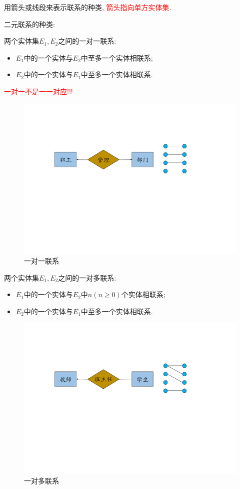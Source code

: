 用箭头或线段来表示联系的种类, \textcolor{red}{箭头指向单方实体集}.


二元联系的种类:
\begin{definition}[一对一联系]
    两个实体集$E_1,E_2$之间的一对一联系:
    \begin{itemize}
        \item $E_1$中的一个实体与$E_2$中至多一个实体相联系;
        \item $E_2$中的一个实体与$E_1$中至多一个实体相联系.
    \end{itemize}
    \textcolor{red}{一对一不是一一对应!!!}
\end{definition}

\begin{figure}[H]
    \centering
    \includegraphics[width=.6\textwidth]{figure/一对一.pdf}
    \caption{一对一联系}
\end{figure}


\begin{definition}[一对多联系]
    两个实体集$E_1,E_2$之间的一对多联系:
    \begin{itemize}
        \item $E_1$中的一个实体与$E_2$中$n(n\geq 0)$个实体相联系;
        \item $E_2$中的一个实体与$E_1$中至多一个实体相联系.
    \end{itemize}
\end{definition}

\begin{figure}[H]
    \centering
    \includegraphics[width=.6\textwidth]{figure/一对多.pdf}
    \caption{一对多联系}
\end{figure}

